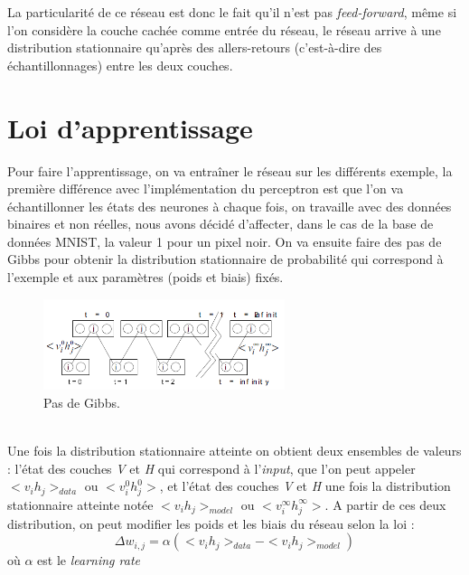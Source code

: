 \documentclass[a4paper,oneside]{report}
\begin{document}
 La particularité de ce réseau est donc le fait qu'il n'est pas
                \textit{feed-forward}, même si l'on considère la couche cachée comme entrée du
               réseau, le réseau arrive à une distribution stationnaire qu'après des allers-retours (c'est-à-dire des échantillonnages) entre
les deux couches.

\section{Loi d'apprentissage}

Pour faire l'apprentissage, on va entraîner le réseau sur les différents exemple, la première différence avec l'implémentation du perceptron est
que l'on va  échantillonner les états des neurones à chaque fois, on travaille avec des données binaires et non réelles, nous avons décidé 
d'affecter, dans le cas de la base de données MNIST, la valeur 1 pour un pixel noir.
On va ensuite faire des pas de Gibbs pour obtenir la distribution stationnaire de probabilité
 qui correspond à l'exemple et aux paramètres (poids et biais) fixés.
\begin{figure}[!ht]
                    \begin{center}
                        \includegraphics[width=200pt]{Images/Gibbs.png}
                    \end{center}
                    \caption{Pas de Gibbs.}
\end{figure}\\

Une fois la distribution stationnaire atteinte on obtient deux ensembles de valeurs : l'état des couches \textit{V} et  \textit{H}
qui correspond à l'\textit{input}, que l'on peut appeler \begin{math}<v_{i}h_{j}>_{data}\end{math} ou \begin{math}<v_{i}^{0}h_{j}^{0}>\end{math}, et l'état des couches \textit{V} et  \textit{H} une fois la distribution stationnaire atteinte notée \begin{math}<v_{i}h_{j}>_{model}\end{math} ou \begin{math}<v_{i}^{\infty}h_{j}^{\infty}>\end{math}. A partir de ces deux distribution, on peut modifier les poids et les biais du réseau selon la loi :
                \begin{equation}
                    \Delta w_{i,j} = \alpha (<v_{i}h_{j}>_{data} - <v_{i}h_{j}>_{model} )
                \end{equation}
                où \begin{math}\alpha\end{math} est le \textit{learning rate}\\
\end{document}
